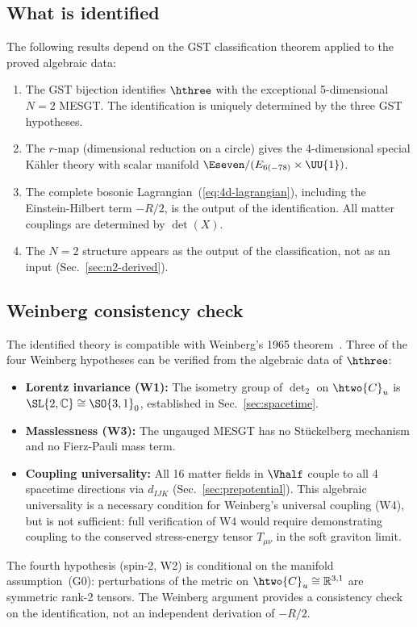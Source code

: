 \subsection{What is identified}

The following results depend on the GST classification theorem applied
to the proved algebraic data:

\begin{enumerate}[resume]
\item The GST bijection identifies $\hthree$ with the exceptional
  5-dimensional $N{=}2$ MESGT. The identification is uniquely
  determined by the three GST hypotheses.

\item The $r$-map (dimensional reduction on a circle) gives the
  4-dimensional special K\"ahler theory with scalar manifold
  $\Eseven / (E_{6(-78)} \times \UU{1})$.

\item The complete bosonic Lagrangian~(\ref{eq:4d-lagrangian}),
  including the Einstein-Hilbert term $-R/2$, is the output of the
  identification. All matter couplings are determined by $\det(X)$.

\item The $N{=}2$ structure appears as the output of the classification,
  not as an input (Sec.~\ref{sec:n2-derived}).
\end{enumerate}

\subsection{Weinberg consistency check}

The identified theory is compatible with Weinberg's 1965
theorem~\cite{Weinberg1964}. Three of the four Weinberg hypotheses can
be verified from the algebraic data of $\hthree$:
\begin{itemize}
\item \textbf{Lorentz invariance (W1):} The isometry group of $\det_2$
  on $\htwo{C}_u$ is $\SL{2,\mathbb{C}} \cong \SO{3,1}_0$, established
  in Sec.~\ref{sec:spacetime}.
\item \textbf{Masslessness (W3):} The ungauged MESGT has no
  St\"uckelberg mechanism and no Fierz-Pauli mass term.
\item \textbf{Coupling universality:} All 16 matter fields in
  $\Vhalf$ couple to all 4 spacetime directions via $d_{IJK}$
  (Sec.~\ref{sec:prepotential}). This algebraic universality is a
  necessary condition for Weinberg's universal coupling (W4), but is
  not sufficient: full verification of W4 would require demonstrating
  coupling to the conserved stress-energy tensor $T_{\mu\nu}$ in the
  soft graviton limit.
\end{itemize}
The fourth hypothesis (spin-2, W2) is conditional on the manifold
assumption~(G0): perturbations of the metric on
$\htwo{C}_u \cong \mathbb{R}^{3,1}$ are symmetric rank-2 tensors. The Weinberg argument provides a consistency
check on the identification, not an independent derivation of $-R/2$.

